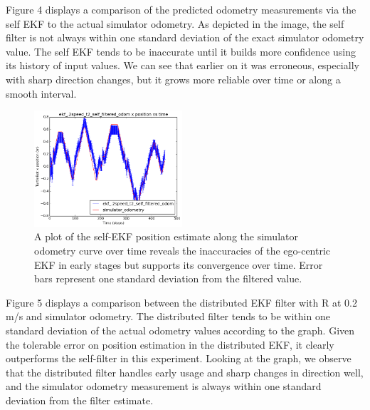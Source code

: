 \documentclass[conference]{IEEEtran} \usepackage[T1]{fontenc} \usepackage[backend=biber, style=ieee]{biblatex}
\begin{document}
Figure 4 displays a comparison of the predicted odometry measurements via the self EKF to the actual simulator 
odometry. As depicted in the image, the self filter is not always within one standard deviation of the exact simulator 
odometry value. The self EKF tends to be inaccurate until it builds more confidence using its history of input values. We can see that earlier on it
was erroneous, especially with sharp direction changes, but it grows more reliable over time or along a smooth interval.

\begin{figure}

\centering 
\includegraphics[width=0.49\textwidth]{ekf_2speed_t2_self_filtered_odom_pos_err_graph}
\caption {A plot of the self-EKF position estimate along the simulator odometry curve over time 
reveals the inaccuracies of the ego-centric EKF in early stages but supports its convergence over time.
Error bars represent one standard deviation from the filtered value.}
\label{pic4} 
\end{figure}

\par
Figure 5 displays a comparison between the distributed EKF filter with R at 0.2 m/s and simulator odometry. The 
distributed filter tends to be within one standard deviation of the actual odometry values according to the graph. 
Given the tolerable error on position estimation in the distributed EKF, it clearly outperforms the self-filter 
in this experiment. Looking at the graph, we observe that the distributed filter handles early usage and sharp changes in direction well, 
and the simulator odometry measurement is always within one standard deviation from the filter estimate.
\end{document}
